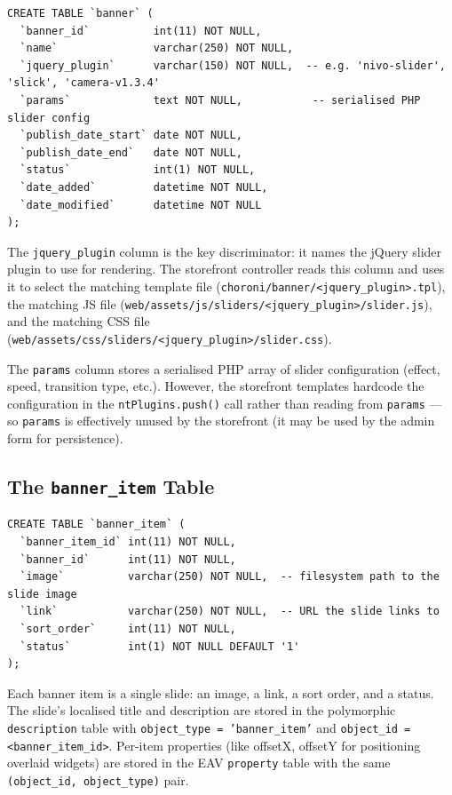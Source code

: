 \documentclass[11pt,a4paper]{article}
\begin{document}
\begin{lstlisting}[caption={The \texttt{banner} table schema.},label={lst:banner-schema}]
CREATE TABLE `banner` (
  `banner_id`          int(11) NOT NULL,
  `name`               varchar(250) NOT NULL,
  `jquery_plugin`      varchar(150) NOT NULL,  -- e.g. 'nivo-slider', 'slick', 'camera-v1.3.4'
  `params`             text NOT NULL,           -- serialised PHP slider config
  `publish_date_start` date NOT NULL,
  `publish_date_end`   date NOT NULL,
  `status`             int(1) NOT NULL,
  `date_added`         datetime NOT NULL,
  `date_modified`      datetime NOT NULL
);
\end{lstlisting}

The \texttt{jquery\_plugin} column is the key discriminator: it names
the jQuery slider plugin to use for rendering. The storefront controller
reads this column and uses it to select the matching template file
(\texttt{choroni/banner/<jquery\_plugin>.tpl}), the matching JS file
(\texttt{web/assets/js/sliders/<jquery\_plugin>/slider.js}), and the
matching CSS file
(\texttt{web/assets/css/sliders/<jquery\_plugin>/slider.css}).

The \texttt{params} column stores a serialised PHP array of slider
configuration (effect, speed, transition type, etc.). However, the
storefront templates hardcode the configuration in the
\texttt{ntPlugins.push()} call rather than reading from
\texttt{params} --- so \texttt{params} is effectively unused by the
storefront (it may be used by the admin form for persistence).

\subsection{The \texttt{banner\_item} Table}

\begin{lstlisting}[caption={The \texttt{banner\_item} table schema.},label={lst:banner-item-schema}]
CREATE TABLE `banner_item` (
  `banner_item_id` int(11) NOT NULL,
  `banner_id`      int(11) NOT NULL,
  `image`          varchar(250) NOT NULL,  -- filesystem path to the slide image
  `link`           varchar(250) NOT NULL,  -- URL the slide links to
  `sort_order`     int(11) NOT NULL,
  `status`         int(1) NOT NULL DEFAULT '1'
);
\end{lstlisting}

Each banner item is a single slide: an image, a link, a sort order, and
a status. The slide's localised title and description are stored in the
polymorphic \texttt{description} table with
\texttt{object\_type = 'banner\_item'} and
\texttt{object\_id = <banner\_item\_id>}. Per-item properties (like
offsetX, offsetY for positioning overlaid widgets) are stored in the
EAV \texttt{property} table with the same
\texttt{(object\_id, object\_type)} pair.
\end{document}
